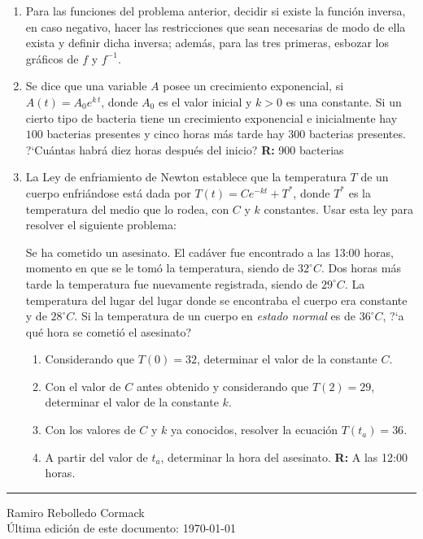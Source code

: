 \documentclass[11pt]{article}
\begin{document}
\begin{enumerate}
  
\item Para las funciones del problema anterior, decidir si existe la funci\'on
  inversa, en caso negativo, hacer las restricciones que sean necesarias de
  modo de ella exista y definir dicha inversa; adem\'as, para las tres
  primeras, esbozar los gr\'aficos de $f$ y $f^{-1}$.

  
\item Se dice que una variable $A$ posee un crecimiento exponencial,
  si $A(t) = A_0e^{k\,t}$, donde $A_0$ es el valor inicial y $k>0$ es una
  constante. Si un cierto tipo de bacteria tiene un crecimiento exponencial
  e inicialmente hay $100$ bacterias presentes y cinco horas m\'as tarde hay
  $300$ bacterias presentes. ?`Cu\'antas habr\'a diez horas despu\'es del
  inicio? \textbf{R:} 900 bacterias


\item La Ley de enfriamiento de Newton establece que la temperatura $T$ de un
  cuerpo enfri\'andose est\'a dada por $T(t)=Ce^{-kt}+T^*$, donde $T^*$ es la
  temperatura del medio que lo rodea, con $C$ y $k$ constantes. Usar esta ley
  para resolver el siguiente problema:

  Se ha cometido un asesinato. El cad\'aver fue encontrado a las 13:00 horas,
  momento en que se le tom\'o la temperatura, siendo de $32^\circ C$.
  Dos horas m\'as tarde la temperatura fue nuevamente registrada,
  siendo de $29^\circ C$. La temperatura del lugar del lugar donde se
  encontraba el cuerpo era constante y de $28^\circ C$.
  Si la temperatura de un cuerpo en \textit{estado normal} es de $36^\circ C$,
  ?`a qu\'e hora se cometi\'o el asesinato?
  \begin{enumerate}
  \item Considerando que $T(0)=32$, determinar el valor de la constante $C$.
  \item Con el valor de $C$ antes obtenido y considerando que $T(2)=29$,
    determinar el valor de la constante $k$.
  \item Con los valores de $C$ y $k$ ya conocidos, resolver la ecuaci\'on
    $T(t_a)=36$.
  \item A partir del valor de $t_a$, determinar la hora del asesinato.
    \textbf{R:} A las 12:00 horas.
  \end{enumerate}
\end{enumerate}

\vfill
\hrule
\vspace{4px}
Ramiro Rebolledo Cormack\\
\'Ultima edici\'on de este documento: \today
\end{document}
